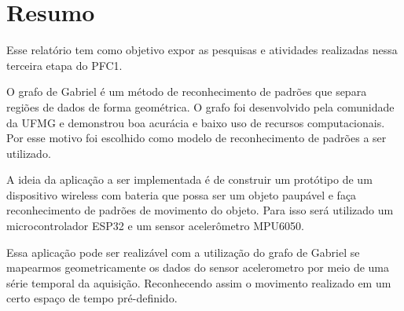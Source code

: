 \section{Resumo}

Esse relatório tem como objetivo expor as pesquisas e atividades realizadas nessa terceira etapa do PFC1.

O grafo de Gabriel\cite{GabrielGraph1} é um método de reconhecimento de padrões que separa regiões de dados de forma geométrica. O grafo foi 
desenvolvido pela comunidade da UFMG e demonstrou boa acurácia e baixo uso de recursos computacionais.
Por esse motivo foi escolhido como modelo de reconhecimento de padrões a ser utilizado.

A ideia da aplicação a ser implementada é de construir um protótipo de um dispositivo wireless com bateria que possa 
ser um objeto paupável e faça reconhecimento de padrões de movimento do objeto. Para isso será utilizado um microcontrolador ESP32 
e um sensor acelerômetro MPU6050.

Essa aplicação pode ser realizável com a utilização do grafo de Gabriel se mapearmos geometricamente os dados do sensor acelerometro por meio de uma
série temporal da aquisição. Reconhecendo assim o movimento realizado em um certo espaço de tempo pré-definido.
